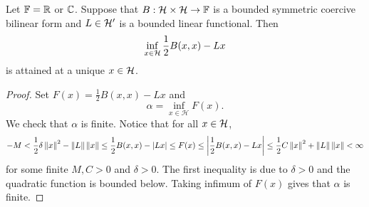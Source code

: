 \begin{theorem}\label{thm:lax_milgram_2}
    Let $\mathbb{F} = \mathbb{R}$ or $\mathbb{C}$. Suppose that $B:\mathcal{H}\times\mathcal{H}\to\mathbb{F}$ is 
    a bounded symmetric coercive bilinear form and $L\in\mathcal{H}'$ is a bounded 
    linear functional. Then 
    \begin{equation*}
        \inf_{x\in\mathcal{H}} \frac{1}{2}B(x,x) - Lx
    \end{equation*}
    is attained at a unique $x\in\mathcal{H}$.
\end{theorem}
\begin{proof}
    Set $F(x) = \frac{1}{2}B(x,x) - Lx$ and 
    \begin{equation*}
        \alpha = \inf_{x\in\mathcal{H}} F(x).
    \end{equation*}
    We check that $\alpha$ is finite. Notice that for all $x\in\mathcal{H}$,
    \begin{equation*}
        -M < \frac{1}{2}\delta\left\lVert {x} \right\rVert^2 - \left\lVert {L} \right\rVert\left\lVert {x} \right\rVert 
        \leq \frac{1}{2}B(x,x) - \left\lvert {Lx} \right\rvert \leq F(x) 
        \leq \left\lvert {\frac{1}{2}B(x,x)-Lx} \right\rvert \leq \frac{1}{2}C\left\lVert {x} \right\rVert^2 + \left\lVert {L} \right\rVert\left\lVert {x} \right\rVert < \infty
    \end{equation*}
    for some finite $M,C>0$ and $\delta>0$. The first inequality is due to 
    $\delta>0$ and the quadratic function is bounded below. Taking infimum 
    of $F(x)$ gives that $\alpha$ is finite. 


\end{proof}
